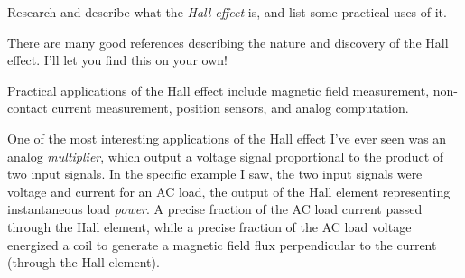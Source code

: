 

Research and describe what the {\it Hall effect} is, and list some practical uses of it.







There are many good references describing the nature and discovery of the Hall effect.  I'll let you find this on your own!

Practical applications of the Hall effect include magnetic field measurement, non-contact current measurement, position sensors, and analog computation.







One of the most interesting applications of the Hall effect I've ever seen was an analog {\it multiplier}, which output a voltage signal proportional to the product of two input signals.  In the specific example I saw, the two input signals were voltage and current for an AC load, the output of the Hall element representing instantaneous load {\it power}.  A precise fraction of the AC load current passed through the Hall element, while a precise fraction of the AC load voltage energized a coil to generate a magnetic field flux perpendicular to the current (through the Hall element).




